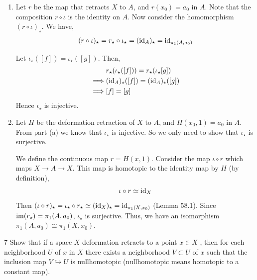 \documentclass[12pt]{article}
\begin{document}
\begin{solution}
    \bbni 

    \begin{enumerate}
        \item[(a)] Let $r$ be the map that retracts $X$ to $A$, and $r(x_0) = a_0$ in $A$. Note that the composition $r \circ \iota$ is the identity on $A$. Now consider the homomorphism $(r \circ \iota)_\star$. We have, 
        \[(r \circ \iota)_\star = r_\star \circ \iota_\star = (\operatorname{id}_A)_\star = \operatorname{id}_{\pi_1(A, a_0)}\]

        Let $\iota_\star([f]) = \iota_\star([g])$. Then,
        \begin{align*}
            &r_\star(\iota_\star([f])) = r_\star(\iota_\star[g]) \\ 
            \implies & (\operatorname{id}_A)_\star([f]) = (\operatorname{id}_A)_\star([g]) \\ 
            \implies & [f] = [g]
        \end{align*}
        Hence $\iota_\star$ is injective. 

        \item [(b)] Let $H$ be the deformation retraction of $X$ to $A$, and $H(x_0, 1) = a_0$ in $A$. From part (a) we know that $\iota_\star$ is injective. So we only need to show that $\iota_\star$ is surjective. 
        
        We define the continuous map $r = H(x, 1)$. Consider the map $\iota \circ r$ which maps $X \to A \to X$.  This map is homotopic to the identity map by $H$ (by definition),
        \[\iota \circ r \simeq \operatorname{id}_X\] 
        Then $(\iota \circ r)_\star = \iota_\star \circ r_\star \simeq (\operatorname{id}_X)_\star = \operatorname{id}_{\pi_1(X, x_0)}$ (Lemma 58.1). Since $\operatorname{im}(r_\star) = \pi_1(A, a_0)$, $\iota_\star$ is surjective.
        Thus, we have an isomorphism $\pi_1(A, a_0) \cong \pi_1(X, x_0)$. 
    \end{enumerate}
\end{solution}

\newpage 

\begin{problem}{7}
    Show that if a space $X$ deformation retracts to a point $x \in X$ , then for each neighborhood $U$ of $x$ in $X$ there exists a neighborhood $V \subset U$ of $x$ such that the inclusion map $V \hookrightarrow U$ is nullhomotopic (nullhomotopic means homotopic to a constant map).
\end{problem}
\end{document}
